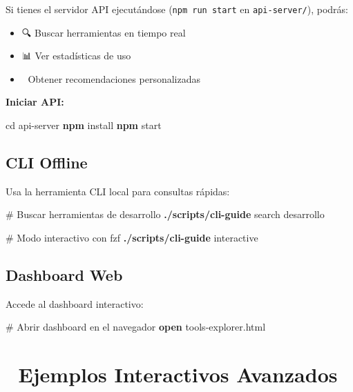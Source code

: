 \documentclass[
  11pt,
  letterpaper,
  oneside,
  openany]{scrbook}
\newenvironment{Shaded}{}{}
\newcommand{\BuiltInTok}[1]{\textcolor[rgb]{0.84,0.23,0.29}{#1}}
\newcommand{\CommentTok}[1]{\textcolor[rgb]{0.42,0.45,0.49}{#1}}
\newcommand{\ExtensionTok}[1]{\textcolor[rgb]{0.84,0.23,0.29}{\textbf{#1}}}
\newcommand{\NormalTok}[1]{\textcolor[rgb]{0.14,0.16,0.18}{#1}}
\providecommand{\tightlist}{%
  \setlength{\itemsep}{0pt}\setlength{\parskip}{0pt}}
\begin{document}
Si tienes el servidor API ejecutándose (\texttt{npm\ run\ start} en
\texttt{api-server/}), podrás:

\begin{itemize}
\tightlist
\item
  🔍 Buscar herramientas en tiempo real
\item
  📊 Ver estadísticas de uso
\item
  🎯 Obtener recomendaciones personalizadas
\end{itemize}

\textbf{Iniciar API:}

\begin{Shaded}
\begin{Highlighting}[]
\BuiltInTok{cd}\NormalTok{ api{-}server}
\ExtensionTok{npm}\NormalTok{ install}
\ExtensionTok{npm}\NormalTok{ start}
\end{Highlighting}
\end{Shaded}

\subsection{CLI Offline}\label{cli-offline}

Usa la herramienta CLI local para consultas rápidas:

\begin{Shaded}
\begin{Highlighting}[]
\CommentTok{\# Buscar herramientas de desarrollo}
\ExtensionTok{./scripts/cli{-}guide}\NormalTok{ search desarrollo}

\CommentTok{\# Modo interactivo con fzf}
\ExtensionTok{./scripts/cli{-}guide}\NormalTok{ interactive}
\end{Highlighting}
\end{Shaded}

\subsection{Dashboard Web}\label{dashboard-web}

Accede al dashboard interactivo:

\begin{Shaded}
\begin{Highlighting}[]
\CommentTok{\# Abrir dashboard en el navegador}
\ExtensionTok{open}\NormalTok{ tools{-}explorer.html}
\end{Highlighting}
\end{Shaded}

\section{🎨 Ejemplos Interactivos
Avanzados}\label{ejemplos-interactivos-avanzados}
\end{document}
